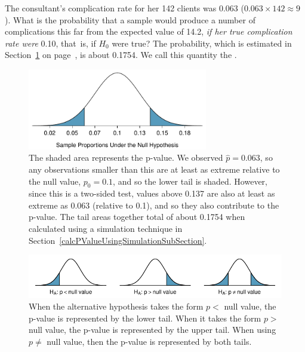 The consultant's complication rate for her 142 clients was 0.063 ($0.063 \times 142 \approx 9$). What is the probability that a sample would produce a number of complications this far from the expected value of 14.2, \emph{if her true complication rate were} 0.10, that~is, if $H_0$ were true? The probability, which is estimated in Section~\ref{MedConsNullNormal} on page~\pageref{MedConsNullNormal}, is about 0.1754. We call this quantity the .

\begin{figure}[ht]
\centering
\includegraphics[width=0.7\textwidth]{ch_foundations_for_inf/figures/MedicalConsultant/MedConsNullNormal}
\caption{The shaded area represents the p-value. We observed $\hat{p} = 0.063$, so any observations smaller than this are at least as extreme relative to the null value, $p_0 = 0.1$, and so the lower tail is shaded. However, since this is a two-sided test, values above 0.137 are also at least as extreme as 0.063 (relative to 0.1), and so they also contribute to the p-value. The tail areas together total of about 0.1754 when calculated using a simulation technique in Section~\ref{calcPValueUsingSimulationSubSection}.}
\label{MedConsNullNormal}
\end{figure}

\begin{figure}[ht]
\centering
\includegraphics[width=\textwidth]{ch_foundations_for_inf/figures/sidedness/sidedness_example_figures}
\caption{When the alternative hypothesis takes the form $p <$ null value, the p-value is represented by the lower tail. When it takes the form $p >$ null value, the p-value is represented by the upper tail. When using $p \neq$ null value, then the p-value is represented by both tails.}
\label{sidedness_example_figures}
\end{figure}


